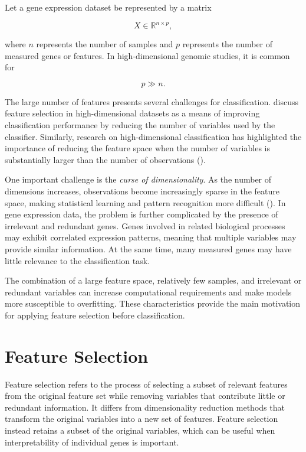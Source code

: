 Let a gene expression dataset be represented by a matrix

$$
X \in \mathbb{R}^{n \times p},
$$

where $n$ represents the number of samples and $p$ represents the number of measured genes or features. In high-dimensional genomic studies, it is common for

$$
p \gg n.
$$

The large number of features presents several challenges for classification. \citet{shroff_comparative_2015} discuss feature selection in high-dimensional datasets as a means of improving classification performance by reducing the number of variables used by the classifier. Similarly, research on high-dimensional classification has highlighted the importance of reducing the feature space when the number of variables is substantially larger than the number of observations (\cite{GHADDAR2018993}).

One important challenge is the \textit{curse of dimensionality}. As the number of dimensions increases, observations become increasingly sparse in the feature space, making statistical learning and pattern recognition more difficult (\cite{venkatesh2019review}). In gene expression data, the problem is further complicated by the presence of irrelevant and redundant genes. Genes involved in related biological processes may exhibit correlated expression patterns, meaning that multiple variables may provide similar information. At the same time, many measured genes may have little relevance to the classification task.

The combination of a large feature space, relatively few samples, and irrelevant or redundant variables can increase computational requirements and make models more susceptible to overfitting. These characteristics provide the main motivation for applying feature selection before classification.

\section{Feature Selection}

Feature selection refers to the process of selecting a subset of relevant features from the original feature set while removing variables that contribute little or redundant information. It differs from dimensionality reduction methods that transform the original variables into a new set of features. Feature selection instead retains a subset of the original variables, which can be useful when interpretability of individual genes is important.

